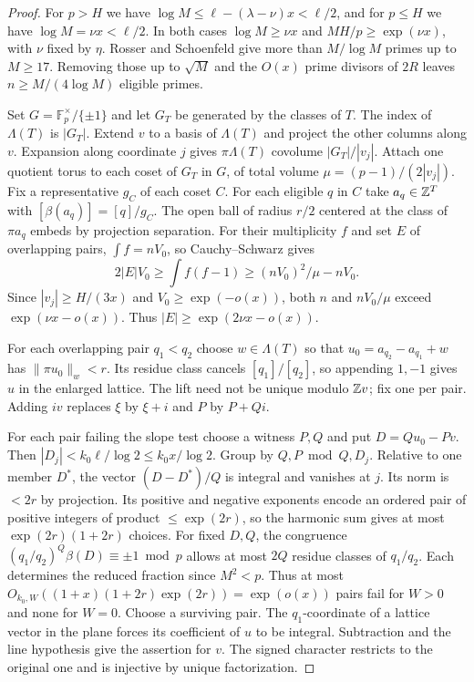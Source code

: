 \begin{proof}
For $p>H$ we have $\log M\le\ell-(\lambda-\nu)x<\ell/2$,
and for $p\le H$ we have $\log M=\nu x<\ell/2$.
In both cases $\log M\ge\nu x$ and $MH/p\ge\exp(\nu x)$, with $\nu$ fixed by $\eta$.
Rosser and Schoenfeld \cite[Corollary~1, (3.5), p.~69]{RS62} give
more than $M/\log M$ primes up to $M\ge17$. Removing those up to $\sqrt M$
and the $O(x)$ prime divisors of $2R$ leaves $n\ge M/(4\log M)$ eligible primes.

Set $G=\mathbb F_p^\times/\{\pm1\}$ and let $G_T$ be generated by the classes
of $T$. The index of $\Lambda(T)$ is $|G_T|$. Extend $v$ to a basis of
$\Lambda(T)$ and project the other columns along $v$.
Expansion along coordinate $j$ gives $\pi\Lambda(T)$ covolume $|G_T|/|v_j|$.
Attach one quotient torus to each coset of $G_T$ in $G$, of total volume
$\mu=(p-1)/(2|v_j|)$. Fix a representative $g_C$ of each coset $C$.
For each eligible $q$ in $C$ take $a_q\in\mathbb Z^T$ with $[\beta(a_q)]=[q]/g_C$.
The open ball of radius $r/2$ centered at the class of $\pi a_q$ embeds by
projection separation. For their multiplicity $f$ and set $E$ of overlapping
pairs, $\int f=nV_0$, so Cauchy--Schwarz gives
\[
 2|E|V_0\ge\int f(f-1)\ge(nV_0)^2/\mu-nV_0 .
\]
Since $|v_j|\ge H/(3x)$ and $V_0\ge\exp(-o(x))$, both $n$ and
$nV_0/\mu$ exceed $\exp(\nu x-o(x))$. Thus $|E|\ge\exp(2\nu x-o(x))$.

For each overlapping pair $q_1<q_2$ choose $w\in\Lambda(T)$ so that
$u_0=a_{q_2}-a_{q_1}+w$ has $\|\pi u_0\|_w<r$.
Its residue class cancels $[q_1]/[q_2]$, so appending $1,-1$ gives $u$
in the enlarged lattice. The lift need not be unique modulo $\mathbb Z v$;
fix one per pair. Adding $iv$ replaces $\xi$ by $\xi+i$ and $P$ by $P+Qi$.

For each pair failing the slope test choose a witness $P,Q$ and put
$D=Qu_0-Pv$. Then $|D_j|<k_0\ell/\log2\le k_0x/\log2$.
Group by $Q,P\bmod Q,D_j$. Relative to one member $D^*$, the vector
$(D-D^*)/Q$ is integral and vanishes at $j$. Its norm is $<2r$ by projection.
Its positive and negative exponents encode an ordered pair of positive integers of product
$\le\exp(2r)$, so the harmonic sum gives at most $\exp(2r)(1+2r)$ choices.
For fixed $D,Q$, the congruence $(q_1/q_2)^Q\beta(D)\equiv\pm1\bmod p$
allows at most $2Q$ residue classes of $q_1/q_2$. Each determines the reduced
fraction since $M^2<p$. Thus at most $O_{k_0,W}((1+x)(1+2r)\exp(2r))
=\exp(o(x))$ pairs fail for $W>0$ and none for $W=0$.
Choose a surviving pair. The $q_1$-coordinate of a lattice vector in the
plane forces its coefficient of $u$ to be integral. Subtraction and the line
hypothesis give the assertion for $v$. The signed character restricts to
the original one and is injective by unique factorization.
\end{proof}
